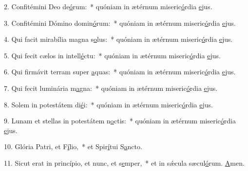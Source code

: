 2. Confitémini Deo de\uline{ó}rum:~* quóniam in ætérnum miseric\uline{ó}rdia \uline{e}jus.\par 
3. Confitémini Dómino domin\uline{ó}rum:~* quóniam in ætérnum miseric\uline{ó}rdia \uline{e}jus.\par 
4. Qui facit mirabília magna s\uline{o}lus:~* quóniam in ætérnum miseric\uline{ó}rdia \uline{e}jus.\par 
5. Qui fecit cælos in intell\uline{é}ctu:~* quóniam in ætérnum miseric\uline{ó}rdia \uline{e}jus.\par 
6. Qui firmávit terram super \uline{a}quas:~* quóniam in ætérnum miseric\uline{ó}rdia \uline{e}jus.\par 
7. Qui fecit luminária m\uline{a}gna:~* quóniam in ætérnum miseric\uline{ó}rdia \uline{e}jus.\par 
8. Solem in potestátem di\uline{é}i:~* quóniam in ætérnum miseric\uline{ó}rdia \uline{e}jus.\par 
9. Lunam et stellas in potestátem n\uline{o}ctis:~* quóniam in ætérnum miseric\uline{ó}rdia \uline{e}jus.\par 
10. Glória Patri, et F\uline{í}lio,~* et Spir\uline{í}tui S\uline{a}ncto.\par 
11. Sicut erat in princípio, et nunc, et s\uline{e}mper,~* et in sǽcula sæcul\uline{ó}rum. \uline{A}men.\par 
